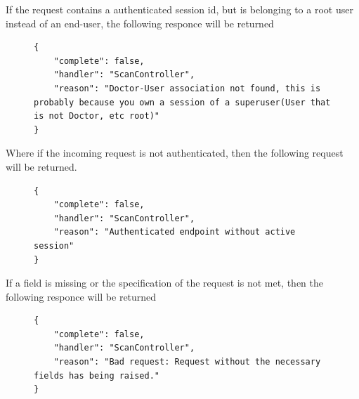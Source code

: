 					If the request contains a authenticated session id, but is belonging to a root user instead of an end-user, the
					following responce will be returned
					\begin{figure}[H]
						\iftrue
						\begin{lstlisting}[]
{
	"complete": false,
	"handler": "ScanController",
	"reason": "Doctor-User association not found, this is probably because you own a session of a superuser(User that is not Doctor, etc root)"
}
						\end{lstlisting}
					\end{figure}
					Where if the incoming request is not authenticated, then the following request will be returned.
					\begin{figure}[H]
						\iftrue
						\begin{lstlisting}[]
{
	"complete": false,
	"handler": "ScanController",
	"reason": "Authenticated endpoint without active session"
}
						\end{lstlisting}
					\end{figure}
					If a field is missing or the specification of the request is not met, then the following responce will be returned
					\begin{figure}[H]
						\iftrue
						\begin{lstlisting}[]
{
	"complete": false,
	"handler": "ScanController",
	"reason": "Bad request: Request without the necessary fields has being raised."
}					
						\end{lstlisting}
					\end{figure}

